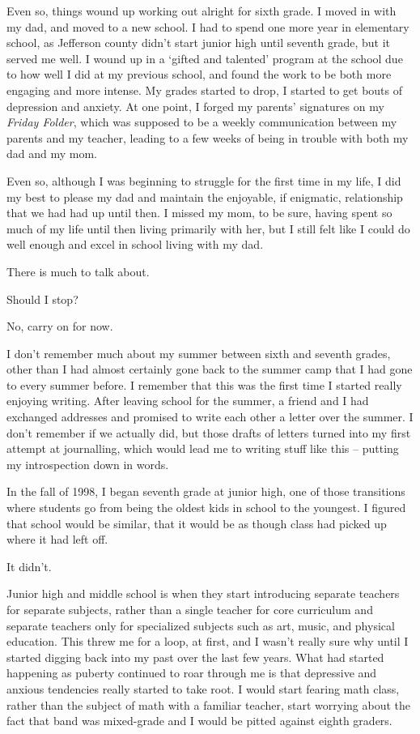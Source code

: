 \begin{paracol}{2}
\begin{leftcolumn}
Even so, things wound up working out alright for sixth grade. I moved in with my dad, and moved to a new school. I had to spend one more year in elementary school, as Jefferson county didn't start junior high until seventh grade, but it served me well. I wound up in a `gifted and talented' program at the school due to how well I did at my previous school, and found the work to be both more engaging and more intense. My grades started to drop, I started to get bouts of depression and anxiety. At one point, I forged my parents' signatures on my \emph{Friday Folder}, which was supposed to be a weekly communication between my parents and my teacher, leading to a few weeks of being in trouble with both my dad and my mom.

Even so, although I was beginning to struggle for the first time in my life, I did my best to please my dad and maintain the enjoyable, if enigmatic, relationship that we had had up until then. I missed my mom, to be sure, having spent so much of my life until then living primarily with her, but I still felt like I could do well enough and excel in school living with my dad.

\begin{ally}
There is much to talk about.
\end{ally}
Should I stop?

\begin{ally}
No, carry on for now.
\end{ally}
I don't remember much about my summer between sixth and seventh grades, other than I had almost certainly gone back to the summer camp that I had gone to every summer before. I remember that this was the first time I started really enjoying writing. After leaving school for the summer, a friend and I had exchanged addresses and promised to write each other a letter over the summer. I don't remember if we actually did, but those drafts of letters turned into my first attempt at journalling, which would lead me to writing stuff like this -- putting my introspection down in words.

In the fall of 1998, I began seventh grade at junior high, one of those transitions where students go from being the oldest kids in school to the youngest. I figured that school would be similar, that it would be as though class had picked up where it had left off.

It didn't.

Junior high and middle school is when they start introducing separate teachers for separate subjects, rather than a single teacher for core curriculum and separate teachers only for specialized subjects such as art, music, and physical education. This threw me for a loop, at first, and I wasn't really sure why until I started digging back into my past over the last few years. What had started happening as puberty continued to roar through me is that depressive and anxious tendencies really started to take root. I would start fearing math class, rather than the subject of math with a familiar teacher, start worrying about the fact that band was mixed-grade and I would be pitted against eighth graders.


\end{leftcolumn}
\end{paracol}
